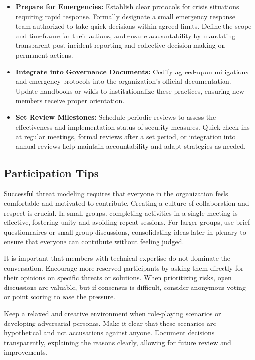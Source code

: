 \begin{itemize}
    \item \textbf{Prepare for Emergencies:} Establish clear protocols for crisis
    situations requiring rapid response. Formally designate a small emergency
    response team authorized to take quick decisions within agreed limits. Define
    the scope and timeframe for their actions, and ensure accountability by
    mandating transparent post-incident reporting and collective decision making on
    permanent actions.
    
    \item \textbf{Integrate into Governance Documents:} Codify agreed-upon
    mitigations and emergency protocols into the organization's official
    documentation. Update handbooks or wikis to institutionalize these practices,
    ensuring new members receive proper orientation.
    
    \item \textbf{Set Review Milestones:} Schedule periodic reviews to assess the
    effectiveness and implementation status of security measures. Quick check-ins at
    regular meetings, formal reviews after a set period, or integration into annual
    reviews help maintain accountability and adapt strategies as needed.
    
\end{itemize}

\subsection{Participation Tips}
\label{subsec:participation_tips}

Successful threat modeling requires that everyone in the organization feels comfortable
and motivated to contribute. Creating a culture of collaboration and respect is
crucial. In small groups, completing activities in a single meeting is
effective, fostering unity and avoiding repeat sessions. For larger groups, use
brief questionnaires or small group discussions, consolidating ideas later in
plenary to ensure that everyone can contribute without feeling judged.

It is important that members with technical expertise do not dominate the
conversation. Encourage more reserved participants by asking them directly for
their opinions on specific threats or solutions. When prioritizing risks, open
discussions are valuable, but if consensus is difficult, consider anonymous
voting or point scoring to ease the pressure.

Keep a relaxed and creative environment when role-playing scenarios or
developing adversarial personas. Make it clear that these scenarios are
hypothetical and not accusations against anyone. Document decisions
transparently, explaining the reasons clearly, allowing for future review and
improvements.

